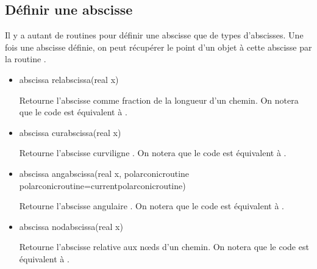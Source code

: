 \documentclass[pdftex]{article}
\begin{document}
\subsection{Définir une abscisse}
Il y a autant de routines pour définir une abscisse que de
types d'abscisses. Une fois une abscisse définie, on peut récupérer le
point d'un objet à cette abscisse par la routine
.
\begin{itemize}
\item {}
  \begin{Vcolor}
    abscissa relabscissa(real x)
  \end{Vcolor}
  Retourne l'abscisse  comme fraction de la longueur d'un
  chemin.
  On notera que le code  est
  équivalent à .
\item {}
  \begin{Vcolor}
    abscissa curabscissa(real x)
  \end{Vcolor}
  Retourne l'abscisse curviligne .
  On notera que le code  est
  équivalent à .
\item {}
  \begin{Vcolor}
    abscissa angabscissa(real x,
    polarconicroutine polarconicroutine=currentpolarconicroutine)
  \end{Vcolor}
  Retourne l'abscisse angulaire .
  On notera que le code  est
  équivalent à .
\item {}
  \begin{Vcolor}
    abscissa nodabscissa(real x)
  \end{Vcolor}
  Retourne l'abscisse  relative aux n\oe{}ds d'un chemin.
  On notera que le code  est
  équivalent à .
\end{itemize}
\end{document}
